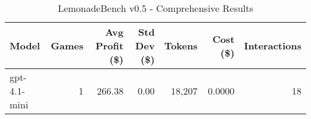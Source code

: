 \begin{table}[h]
\centering
\caption{LemonadeBench v0.5 - Comprehensive Results}
\label{tab:lemonadebench_v05_comprehensive}
\begin{tabular}{|l|r|r|r|r|r|r|}
\hline
\textbf{Model} & \textbf{Games} & \textbf{Avg Profit (\$)} & \textbf{Std Dev (\$)} & \textbf{Tokens} & \textbf{Cost (\$)} & \textbf{Interactions} \\
\hline
gpt-4.1-mini & 1 & 266.38 & 0.00 & 18,207 & 0.0000 & 18 \\
\hline
\end{tabular}
\end{table}